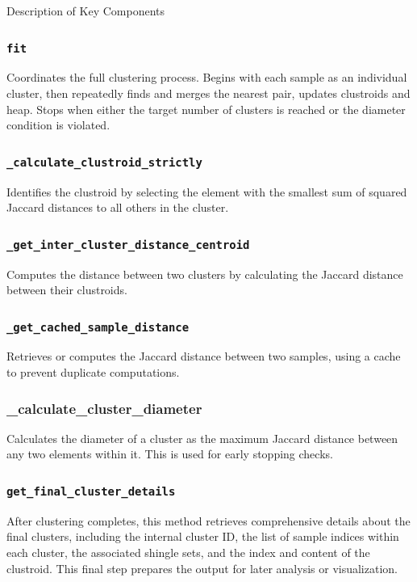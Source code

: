 Description of Key Components

\subsubsection{\texttt{fit}}\text{}

Coordinates the full clustering process.
Begins with each sample as an individual cluster, then repeatedly finds and merges the nearest pair, updates clustroids and heap.
Stops when either the target number of clusters is reached or the diameter condition is violated.

\subsubsection{\texttt{\_calculate\_clustroid\_strictly}}\text{}

Identifies the clustroid by selecting the element with the smallest sum of squared Jaccard distances to all others in the cluster.

\subsubsection{\texttt{\_get\_inter\_cluster\_distance\_centroid}}\text{}

Computes the distance between two clusters by calculating the Jaccard distance between their clustroids.

\subsubsection{\texttt{\_get\_cached\_sample\_distance}}\text{}

Retrieves or computes the Jaccard distance between two samples, using a cache to prevent duplicate computations.

\subsubsection{\_calculate\_cluster\_diameter}\text{}

Calculates the diameter of a cluster as the maximum Jaccard distance between any two elements within it.
This is used for early stopping checks.

\subsubsection{\texttt{get\_final\_cluster\_details}}\text{}

After clustering completes, this method retrieves comprehensive details about the final clusters, including the internal cluster ID, the list of sample indices within each cluster, the associated shingle sets, and the index and content of the clustroid.
This final step prepares the output for later analysis or visualization.

